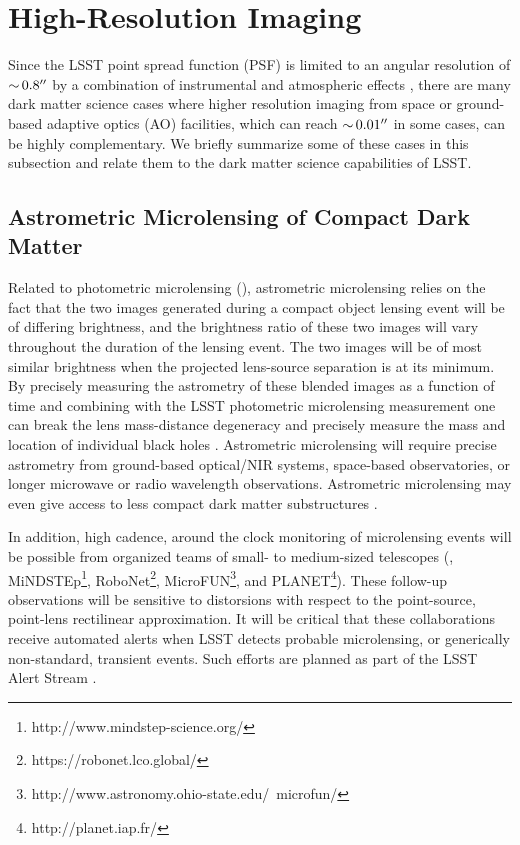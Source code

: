 \section{High-Resolution Imaging }
\label{sec:highres}


Since the LSST point spread function (PSF) is limited to an angular resolution of $ {\sim}\, 0.8''$ by a combination of instrumental and  atmospheric effects \citep{0805.2366}, there are many dark matter science cases where higher resolution imaging from space or ground-based adaptive optics (AO) facilities, which can reach $ {\sim}\, 0.01''$ in some cases, can be highly complementary. We briefly summarize some of these cases in this subsection and relate them to the dark matter science capabilities of LSST.

\subsection{Astrometric Microlensing of Compact Dark Matter }
\label{sec:astrometric_microlens}

Related to photometric microlensing (), astrometric microlensing relies on the fact that the two images generated during a compact object lensing event will be of differing brightness, and the brightness ratio of these two images will vary throughout the duration of the lensing event.
The two images will be of most similar brightness when the projected lens-source separation is at its minimum.
By precisely measuring the astrometry of these blended images as a function of time and combining with the LSST photometric microlensing measurement one can break the lens mass-distance degeneracy and precisely measure the mass and location of individual black holes \citep{2015ApJ...814L..11Y}.
Astrometric microlensing will require precise astrometry from ground-based optical/NIR systems, space-based observatories, or longer microwave or radio wavelength observations.
Astrometric microlensing may even give access to less compact dark matter substructures \citep{1804.01991}.

In addition, high cadence, around the clock monitoring of microlensing events will be possible from organized teams of small- to medium-sized telescopes (\eg, MiNDSTEp\footnote{http://www.mindstep-science.org/}, RoboNet\footnote{https://robonet.lco.global/}, MicroFUN\footnote{http://www.astronomy.ohio-state.edu/~microfun/}, and PLANET\footnote{http://planet.iap.fr/}). 
These follow-up observations will be sensitive to distorsions with respect to the point-source, point-lens rectilinear approximation.
It will be critical that these collaborations receive automated alerts when LSST detects probable microlensing, or generically non-standard, transient events. 
Such efforts are planned as part of the LSST Alert Stream \citep{0805.2366}.

